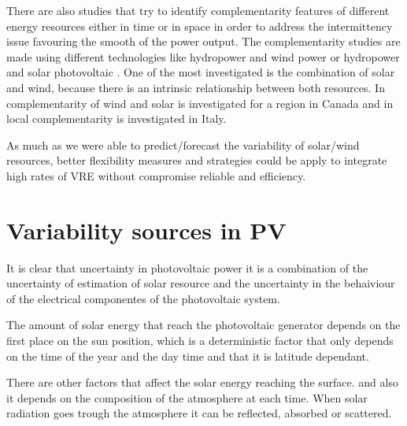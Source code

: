 
There are also studies that try to identify complementarity features of different energy resources either in time or in space in order to address the intermittency issue favouring the smooth of the power output. The complementarity studies are made using different technologies like hydropower and wind power \cite*{Denault2009, Silva2016} or hydropower and solar photovoltaic \cite*{Francois2016, Beluco2012, Kougias2016}. One of the most investigated is the combination of solar and wind, because there is an intrinsic relationship between both resources. In \cite*{Hoicka2011} complementarity of wind and solar is investigated for a region in Canada and in \cite*{Monforti2014} local complementarity is investigated in Italy.


As much as we were able to predict/forecast the variability of solar/wind resources, better flexibility measures and strategies could be apply to integrate high rates of VRE without compromise reliable and efficiency. 
\section{Variability sources in PV}

It is clear that uncertainty in photovoltaic power it is a combination of the uncertainty of estimation of solar resource and the uncertainty in the behaiviour of the electrical componentes of the photovoltaic system.

The amount of solar energy that reach the photovoltaic generator depends on the first place on the sun position, which is a deterministic factor that only depends on the time of the year and the day time and that it is latitude dependant.

There are other factors that affect the solar energy reaching the surface. and also it depends on the composition of the atmosphere at each time. When solar radiation goes trough the atmosphere it can be reflected, absorbed or scattered.

